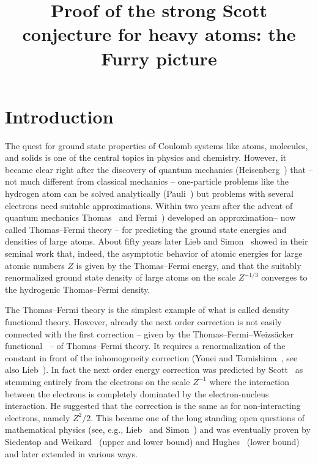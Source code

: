\documentclass[AHL,Unicode,longabstracts,published]{cedram}
\title[Strong Scott conjecture]{Proof of the strong Scott conjecture for heavy atoms: the Furry picture}
\author[\initial{K.} \lastname{Merz}]{\firstname{Konstantin} \lastname{Merz}}
\author[\initial{H.} \lastname{Siedentop}]{\firstname{Heinz} \lastname{Siedentop}}
\begin{document}
\maketitle

\section{Introduction}
The quest for ground state properties of Coulomb systems like atoms, molecules, and solids is one of the central topics in physics and chemistry. However, it became clear right after the discovery of quantum mechanics (Heisenberg~\cite{Heisenberg1925}) that -- not much different from classical mechanics -- one-particle problems like the hydrogen atom can be solved analytically (Pauli~\cite{Pauli1926}) but problems with several electrons need suitable approximations. Within two years after the advent of quantum mechanics Thomas~\cite{Thomas1927} and Fermi~\cite{Fermi1927,Fermi1928}) developed an approximation-- now called Thomas--Fermi theory -- for predicting the ground state energies and densities of large atoms. About fifty years later Lieb and Simon~\cite{LiebSimon1977} showed in their seminal work that, indeed, the asymptotic behavior of atomic energies for large atomic numbers $Z$ is given by the Thomas--Fermi energy, and that the suitably renormalized ground state density of large atoms on the scale $Z^{-1/3}$ converges to the hydrogenic Thomas--Fermi density.

The Thomas--Fermi theory is the simplest example of what is called density functional theory. However, already the next order correction is not easily connected with the first correction -- given by the Thomas--Fermi--Weizs\"acker functional~\cite{Weizsacker1935} -- of Thomas--Fermi theory. It requires a renormalization of the constant in front of the inhomogeneity correction (Yonei and Tomishima~\cite{YoneiTomishima1965}, see also Lieb~\cite{Lieb1982A,LiebLiberman1982}). In fact the next order energy correction was predicted by Scott~\cite{Scott1952} as stemming entirely from the electrons on the scale $Z^{-1}$ where the interaction between the electrons is completely dominated by the electron-nucleus interaction. He suggested that the correction is the same as for non-interacting electrons, namely $Z^2/2$. This became one of the long standing open questions of mathematical physics (see, e.g., Lieb~\cite{Lieb1980} and Simon~\cite[Problem~10B]{Simon1984}) and was eventually proven by Siedentop and Weikard~\cite{SiedentopWeikard1986,SiedentopWeikard1987O,SiedentopWeikard1987U,SiedentopWeikard1988,SiedentopWeikard1989} (upper and lower bound) and Hughes~\cite{Hughes1986,Hughes1990} (lower bound) and later extended in various ways.
\end{document}
